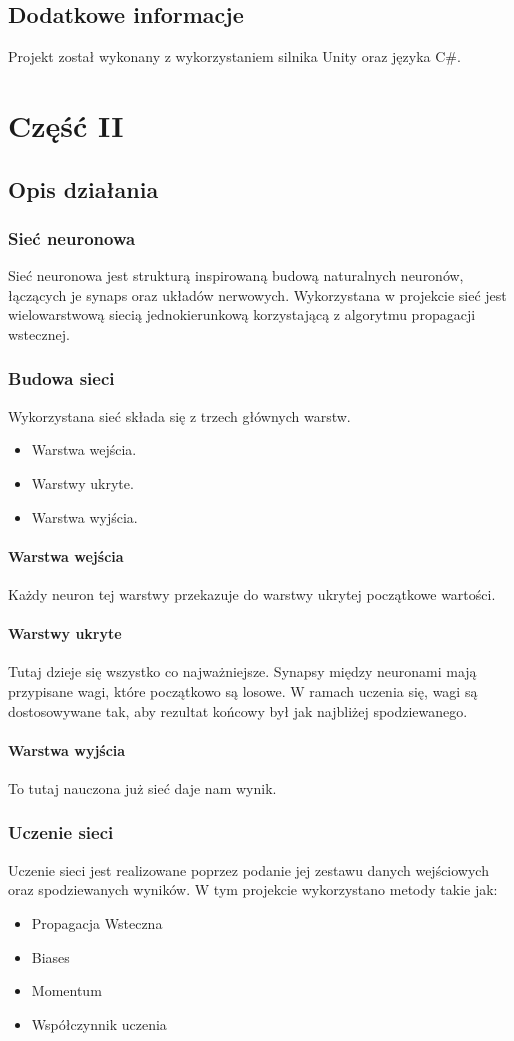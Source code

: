 \documentclass[12pt,a4paper]{article}
\begin{document}
	\subsection{Dodatkowe informacje}
	Projekt został wykonany z wykorzystaniem silnika Unity oraz języka C\#.
	\newpage
	\section{Część II}
	\subsection{Opis działania} 
\subsubsection{Sieć neuronowa}
Sieć neuronowa jest strukturą inspirowaną budową naturalnych neuronów, łączących je synaps oraz układów nerwowych. Wykorzystana w projekcie sieć jest wielowarstwową siecią jednokierunkową korzystającą z algorytmu propagacji wstecznej.
\subsubsection{Budowa sieci}
Wykorzystana sieć składa się z trzech głównych warstw.
\begin{itemize}
	\item Warstwa wejścia.
	\item Warstwy ukryte.
	\item Warstwa wyjścia.
\end{itemize}
\paragraph*{Warstwa wejścia} Każdy neuron tej warstwy przekazuje do warstwy ukrytej początkowe wartości.
\paragraph*{Warstwy ukryte} Tutaj dzieje się wszystko co najważniejsze. Synapsy między neuronami mają przypisane wagi, które początkowo są losowe. W ramach uczenia się, wagi są dostosowywane tak, aby rezultat końcowy był jak najbliżej spodziewanego.
\paragraph*{Warstwa wyjścia} To tutaj nauczona już sieć daje nam wynik.
\subsubsection{Uczenie sieci}
Uczenie sieci jest realizowane poprzez podanie jej zestawu danych wejściowych oraz spodziewanych wyników. W tym projekcie wykorzystano metody takie jak:
\begin{itemize}
\item Propagacja Wsteczna
\item Biases
\item Momentum
\item Współczynnik uczenia
\end{itemize}
\end{document}
